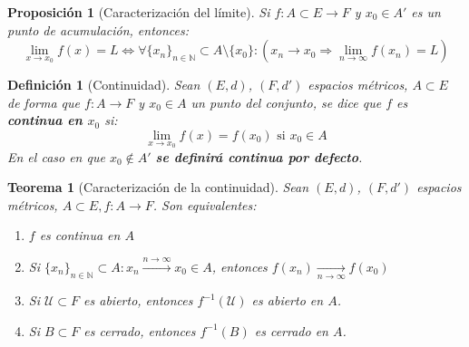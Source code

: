 \documentclass[10pt,a4paper,openright]{book}
\theoremstyle{break}
\newtheorem*{defi}{Definición}
\newtheorem*{theo}{Teorema}
\newtheorem*{prop}{Proposición}
\begin{document}
\begin{prop}[Caracterización del límite]
Si $f: A \subset E \to F$ y $x_0 \in A'$ es un punto de acumulación, entonces:
$$\lim_{x \to x_0} f(x) = L \Leftrightarrow \forall \{x_n\}_{n \in \mathbb{N}} \subset A \setminus \{x_0\}: \left(x_n \to x_0 \Rightarrow \lim_{n \to \infty} f(x_n) = L\right)$$
\end{prop}

\begin{defi}[Continuidad]
Sean $(E,d)$, $(F,d')$ espacios métricos, $A \subset E$ de forma que $f:A \to F$ y $x_0 \in A$ un punto del conjunto, se dice que $f$ es \textbf{continua en $x_0$} si:
$$\lim_{x \to x_0} f(x)=f(x_0) \mbox{ si }x_0\in A $$
En el caso en que $x_0\notin A'$ \textbf{se definirá continua por defecto}.   
\end{defi}

\begin{theo}[Caracterización de la continuidad]
Sean $(E,d)$, $(F,d')$ espacios métricos, $A \subset E, f:A \to F$. Son equivalentes:
\begin{enumerate}
\item $f$ es continua en $A$
\item Si $\{x_n\}_{n \in \mathbb{N}} \subset A : x_n \xrightarrow{n\rightarrow\infty} x_0 \in A$, entonces $f(x_n) \xrightarrow[n\rightarrow\infty]{} f(x_0)$
\item Si $\mathcal{U} \subset F$ es abierto, entonces $f^{-1}(\mathcal{U})$ es abierto en $A$.
\item Si $B\subset F$ es cerrado, entonces $f^{-1}(B)$ es cerrado en $A$.
\end{enumerate}
\end{theo}
\end{document}
